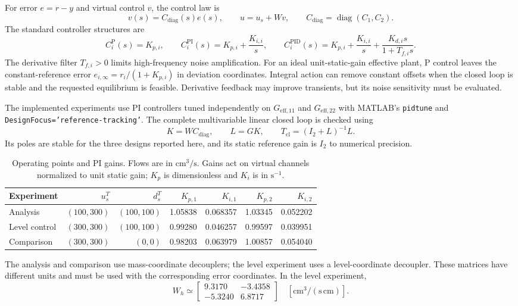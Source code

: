 For error $e=r-y$ and virtual control $v$, the control law is
\begin{equation}
 v(s)=C_{\mathrm{diag}}(s)e(s),\qquad
 u=u_s+Wv,\qquad C_{\mathrm{diag}}=\operatorname{diag}(C_1,C_2).
\end{equation}
The standard controller structures are
\begin{equation}
 C_i^{\mathrm P}(s)=K_{p,i},\qquad
 C_i^{\mathrm{PI}}(s)=K_{p,i}+\frac{K_{i,i}}{s},\qquad
 C_i^{\mathrm{PID}}(s)=K_{p,i}+\frac{K_{i,i}}{s}
                       +\frac{K_{d,i}s}{1+T_{f,i}s}.
\end{equation}
The derivative filter $T_{f,i}>0$ limits high-frequency noise amplification.
For an ideal unit-static-gain effective plant, P control leaves the
constant-reference error $e_{i,\infty}=r_i/(1+K_{p,i})$ in deviation
coordinates. Integral action can remove constant offsets when the closed
loop is stable and the requested equilibrium is feasible. Derivative
feedback may improve transients, but its noise sensitivity must be evaluated.

The implemented experiments use PI controllers tuned independently on
$G_{\mathrm{eff},11}$ and $G_{\mathrm{eff},22}$ with MATLAB's
\texttt{pidtune} and \texttt{DesignFocus='reference-tracking'}.
The complete multivariable linear closed loop is checked using
\begin{equation}
 K=WC_{\mathrm{diag}},\qquad L=GK,\qquad
 T_{\mathrm{cl}}=(I_2+L)^{-1}L.
\end{equation}
Its poles are stable for the three designs reported here, and its static
reference gain is $I_2$ to numerical precision.

\begin{table}[htbp]
 \centering
 \caption{Operating points and PI gains. Flows are in $\mathrm{cm^3/s}$.
 Gains act on virtual channels normalized to unit static gain; $K_p$ is
 dimensionless and $K_i$ is in $\mathrm{s^{-1}}$.}
 \label{tab:p3-gains}
 \begin{tabular}{lrrrrrr}
 \hline
 Experiment & $u_s^T$ & $d_s^T$ & $K_{p,1}$ & $K_{i,1}$ & $K_{p,2}$ & $K_{i,2}$\\
 \hline
 Analysis & $(100,300)$ & $(100,100)$ & 1.05838 & 0.068357 & 1.03345 & 0.052202\\
 Level control & $(300,300)$ & $(100,100)$ & 0.99280 & 0.046257 & 0.99597 & 0.039951\\
 Comparison & $(300,300)$ & $(0,0)$ & 0.98203 & 0.063979 & 1.00857 & 0.054040\\
 \hline
 \end{tabular}
\end{table}
The analysis and comparison use mass-coordinate decouplers; the level
experiment uses a level-coordinate decoupler. These matrices have different
units and must be used with the corresponding error coordinates. In the
level experiment,
\begin{equation}
 W_h\simeq\begin{bmatrix}9.3170&-3.4358\\-5.3240&6.8717\end{bmatrix}
 \quad [\mathrm{cm^3/(s\,cm)}].
\end{equation}

